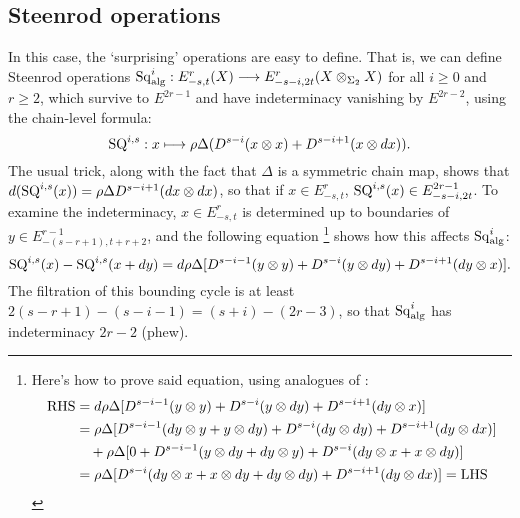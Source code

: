 \documentclass[10pt]{article}
\newcommand{\Sq}{\mathrm{Sq}}
\begin{document}
\begin{letter to Dwyer}
\subsection{Steenrod operations}
In this case, the `surprising' operations are easy to define. That is, we can define Steenrod operations $\Sq^i_\textup{alg}:E^r_{-s,t}(X)\to E^r_{-s-i,2t}(X\otimes_{\Sigma_2}X)$ for all $i\geq 0$ and $r\geq2$, which survive to $E^{2r-1}$ and have indeterminacy vanishing by $E^{2r-2}$, using the chain-level formula:
\[\textup{SQ}^{i,s}:x\mapsto \rho\Delta (D^{s-i}(x\otimes x)+D^{s-i+1}(x\otimes dx)).\]
The usual trick, along with the fact that $\Delta$ is a symmetric chain map, shows that $d(\textup{SQ}^{i,s}(x))=\rho\Delta D^{s-i+1}(dx\otimes dx)$, so that if $x\in E^r_{-s,t}$, $\textup{SQ}^{i,s}(x)\in E^{2r-1}_{-s-i,2t}$. To examine the indeterminacy, $x\in E^r_{-s,t}$ is determined up to boundaries of $y\in E^{r-1}_{-(s-r+1),t+r+2}$, and the following equation%
\footnote{Here's how to prove said equation, using analogues of \cite[(1.111),(1.112)]{MR2245560}:
\begin{alignat*}{2}
\textup{RHS}
&=
d\rho\Delta [D^{s-i-1}(y\otimes y)+D^{s-i}(y\otimes dy)+D^{s-i+1}(dy\otimes x)]%
\\
&=
\rho\Delta [D^{s-i-1}(dy\otimes y+y\otimes dy)+D^{s-i}(dy\otimes dy)+D^{s-i+1}(dy\otimes dx)]%
\\
&\ \ \ +
\rho\Delta [0+D^{s-i-1}(y\otimes dy+dy\otimes y)+D^{s-i}(dy\otimes x+x\otimes dy)]%
\\
&=
\rho\Delta [D^{s-i}(dy\otimes x+x\otimes dy+dy\otimes dy)
+D^{s-i+1}(dy\otimes dx)]=\textup{LHS}%
\end{alignat*}} shows how this affects $\Sq^{i}_\textup{alg}$:
\[\textup{SQ}^{i,s}(x)-\textup{SQ}^{i,s}(x+dy)=d\rho\Delta [D^{s-i-1}(y\otimes y)+D^{s-i}(y\otimes dy)+D^{s-i+1}(dy\otimes x)].\]
The filtration of this bounding cycle is at least $2(s-r+1)-(s-i-1)=(s+i)-(2r-3)$, so that $\Sq_\textup{alg}^i$ has indeterminacy $2r-2$ (phew).




\end{letter to Dwyer}
\end{document}
